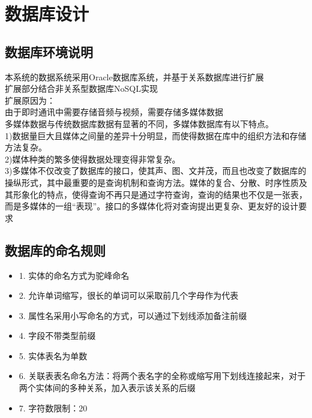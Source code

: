 \chapter{数据库设计}
\section{数据库环境说明}
本系统的数据系统采用Oracle数据库系统，并基于关系数据库进行扩展\\
扩展部分结合非关系型数据库NoSQL实现\\
扩展原因为：\\
由于即时通讯中需要存储音频与视频，需要存储多媒体数据\\
多媒体数据与传统数据库数据有显著的不同，多媒体数据库有以下特点。\\
1)数据量巨大且媒体之间量的差异十分明显，而使得数据在库中的组织方法和存储方法复杂。\\
2)媒体种类的繁多使得数据处理变得非常复杂。\\
3)多媒体不仅改变了数据库的接口，使其声、图、文并茂，而且也改变了数据库的操纵形式，其中最重要的是查询机制和查询方法。媒体的复合、分散、时序性质及其形象化的特点，使得查询不再只是通过字符查询，查询的结果也不仅是一张表，而是多媒体的一组“表现”。接口的多媒体化将对查询提出更复杂、更友好的设计要求



\section{数据库的命名规则}
\begin{itemize}
    \item 1. 实体的命名方式为驼峰命名
    \item 2. 允许单词缩写，很长的单词可以采取前几个字母作为代表
    \item 3. 属性名采用小写命名的方式，可以通过下划线添加备注前缀
    \item 4. 字段不带类型前缀
    \item 5. 实体表名为单数
    \item 6. 关联表表名命名方法：将两个表名字的全称或缩写用下划线连接起来，对于两个实体间的多种关系，加入表示该关系的后缀
    \item 7. 字符数限制：20
\end{itemize}

